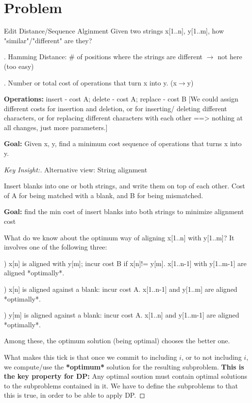 \documentclass[openany]{article}
\begin{document}
\section*{Problem}
\begin{problem*}{Edit Distance/Sequence Alginment}
    Given two strings x[1..n], y[1..m], how "similar"/"different" are they?

    . Hamming Distance: $\#$ of positions where the strings are different $\rightarrow$ not here (too easy)
    
    . Number or total cost of operations that turn x into y. (x$\rightarrow$y)
    
    \textbf{Operations:} insert - cost A; delete - cost A; replace - cost B [We could assign different costs for insertion and deletion, or for inserting/ deleting different characters, or for replacing different characters with
each other ==> nothing at all changes, just more parameters.]

    \textbf{Goal:} Given x, y, find a minimum cost sequence of operations that turns x into y.
\end{problem*}

\begin{proof}[Key Insight:]{}
		\renewcommand{\qedsymbol}{} %

        Alternative view: String alignment
        
        Insert blanks into one or both strings, and write them on top of each other. Cost of A for being matched with a blank, and B for being mismatched.

        \textbf{Goal:} find the min cost of insert blanks into both strings to minimize alignment cost

        What do we know about the optimum way of aligning x[1..n] with y[1..m]? It involves one of the following three:
        
        ) x[n] is aligned with y[m]; incur cost B if x[n]!= y[m]. x[1..n-1] with y[1..m-1] are aligned *optimally*.
        
        ) x[n] is aligned against a blank: incur cost A. x[1..n-1] and y[1..m] are aligned *optimally*.

        ) y[m] is aligned against a blank: incur cost A. x[1..n] and y[1..m-1] are aligned *optimally*.

        \qquad Among these, the optimum solution (being optimal) chooses the better one.

        What makes this tick is that once we commit to including $i$, or to not including $i$, we compute/use the \textbf{*optimum*} solution for the resulting subproblem. \textbf{This is the key property for DP:} Any optimal soution must contain optimal solutions to the subproblems contained in it. We have to define the subproblems to that this is true, in order to be able to apply DP.
\end{proof}
\end{document}
